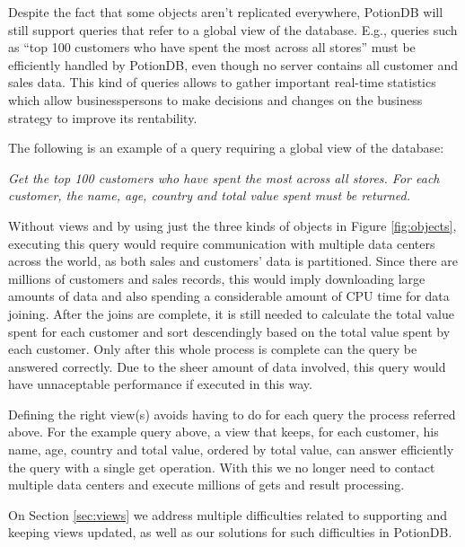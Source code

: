 \documentclass[sigplan,10pt]{acmart}
\newcommand{\emphvspace}{0.5\baselineskip}
\newcommand{\lineemph}[1]{\vspace{\emphvspace}\hspace{2em}\emph{#1}\vspace{\emphvspace}}
\newcommand{\andre}[1]{\nbnote{Andre}{blue}{#1}}
\begin{document}
Despite the fact that some objects aren't replicated everywhere, PotionDB will still support queries that refer to a global view of the database.
E.g., queries such as ``top 100 customers who have spent the most across all stores'' must be efficiently handled by PotionDB, even though no server contains all customer and sales data. 
This kind of queries allows to gather important real-time statistics which allow businesspersons to make decisions and changes on the business strategy to improve its rentability.
\andre{Should I refer tpc-h here?}

The following is an example of a query requiring a global view of the database:

\lineemph{Get the top 100 customers who have spent the most across all stores. For each customer, the name, age, country and total value spent must be returned.}

Without views and by using just the three kinds of objects in Figure \ref{fig:objects}, executing this query would require communication with multiple data centers across the world, as both sales and customers' data is partitioned.
Since there are millions of customers and sales records, this would imply downloading large amounts of data and also spending a considerable amount of CPU time for data joining.
After the joins are complete, it is still needed to calculate the total value spent for each customer and sort descendingly based on the total value spent by each customer.
Only after this whole process is complete can the query be answered correctly.
Due to the sheer amount of data involved, this query would have unnaceptable performance if executed in this way.

Defining the right view(s) avoids having to do for each query the process referred above.
For the example query above, a view that keeps, for each customer, his name, age, country and total value, ordered by total value, can answer efficiently the query with a single get operation.
With this we no longer need to contact multiple data centers and execute millions of gets and result processing.

On Section \ref{sec:views} we address multiple difficulties related to supporting and keeping views updated, as well as our solutions for such difficulties in PotionDB.

\fi
\fi
\end{document}
